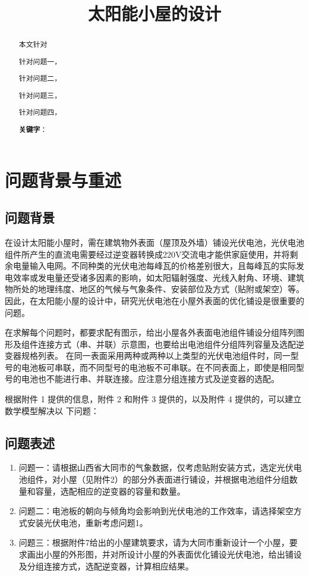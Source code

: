 \documentclass{ctexart}
\title{太阳能小屋的设计}
\date{}
\begin{document}
	\maketitle
	\renewcommand{\abstractname}{\Large 摘要\\}
	\begin{abstract}
		\normalsize
	本文针对

	针对问题一，

针对问题二，

	针对问题三，

针对问题四，

		\textbf{关键字}：

	\end{abstract}
	\newpage
	
	\section{问题背景与重述}
	\subsection{问题背景}
	在设计太阳能小屋时，需在建筑物外表面（屋顶及外墙）铺设光伏电池，光伏电池组件所产生的直流电需要经过逆变器转换成220V交流电才能供家庭使用，并将剩余电量输入电网。不同种类的光伏电池每峰瓦的价格差别很大，且每峰瓦的实际发电效率或发电量还受诸多因素的影响，如太阳辐射强度、光线入射角、环境、建筑物所处的地理纬度、地区的气候与气象条件、安装部位及方式（贴附或架空）等。因此，在太阳能小屋的设计中，研究光伏电池在小屋外表面的优化铺设是很重要的问题。

在求解每个问题时，都要求配有图示，给出小屋各外表面电池组件铺设分组阵列图形及组件连接方式（串、并联）示意图，也要给出电池组件分组阵列容量及选配逆变器规格列表。
在同一表面采用两种或两种以上类型的光伏电池组件时，同一型号的电池板可串联，而不同型号的电池板不可串联。在不同表面上，即使是相同型号的电池也不能进行串、并联连接。应注意分组连接方式及逆变器的选配。

根据附件 1 提供的信息，附件 2 和附件 3 提供的，以及附件 4 提供的，可以建立数学模型解决以
下问题：
	
	\subsection{问题表述}
	\begin{enumerate}[(1)]
		\item 问题一：请根据山西省大同市的气象数据，仅考虑贴附安装方式，选定光伏电池组件，对小屋（见附件2）的部分外表面进行铺设，并根据电池组件分组数量和容量，选配相应的逆变器的容量和数量。
		\item 问题二：电池板的朝向与倾角均会影响到光伏电池的工作效率，请选择架空方式安装光伏电池，重新考虑问题1。
		\item 问题三：根据附件7给出的小屋建筑要求，请为大同市重新设计一个小屋，要求画出小屋的外形图，并对所设计小屋的外表面优化铺设光伏电池，给出铺设及分组连接方式，选配逆变器，计算相应结果。

	\end{enumerate}
\end{document}

